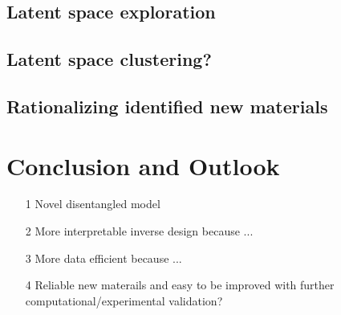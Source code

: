 \documentclass[a4paper]{article}
\begin{document}
\subsection{Latent space exploration}

\subsection{Latent space clustering?}

\subsection{Rationalizing identified new materials}

\section{Conclusion and Outlook}

\begin{enumerate}
    \item[1] Novel disentangled model
    \item[2] More interpretable inverse design because ...
    \item[3] More data efficient because ...
    \item[4] Reliable new materails and easy to be improved with further computational/experimental validation?

\end{enumerate}



\end{document}

